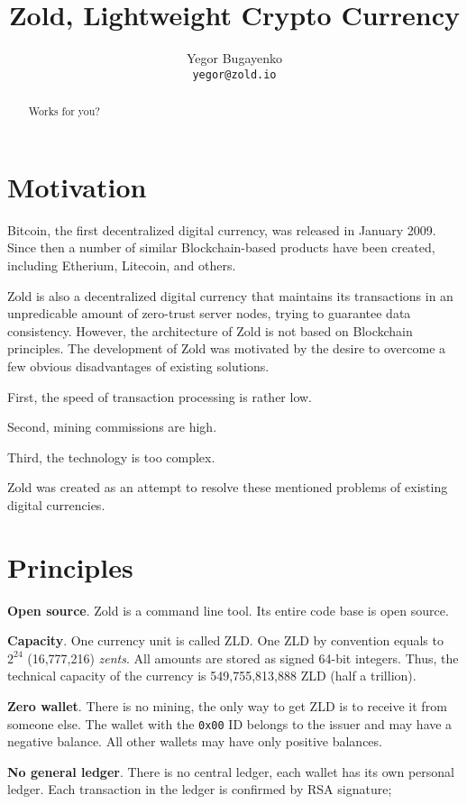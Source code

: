 \documentclass[11pt,oneside]{article}
\title{Zold, Lightweight Crypto Currency}
\author{Yegor Bugayenko\\\texttt{yegor@zold.io}}
\begin{document}
\raggedbottom
\maketitle
\begin{abstract}
Works for you?
\end{abstract}

\section{Motivation}

Bitcoin, the first decentralized digital currency, was released in
January 2009. Since then a number of similar Blockchain-based products have been
created, including Etherium, Litecoin, and others.

Zold is also a decentralized digital currency that maintains its transactions
in an unpredicable amount of zero-trust server nodes, trying to guarantee
data consistency. However, the architecture of Zold is not based on Blockchain
principles. The development of Zold was motivated by the desire to overcome
a few obvious disadvantages of existing solutions.

First, the speed of transaction processing is rather low.

Second, mining commissions are high.

Third, the technology is too complex.

Zold was created as an attempt to resolve these mentioned problems
of existing digital currencies.

\section{Principles}

\textbf{Open source}.
Zold is a command line tool. Its entire code base is open source.

\textbf{Capacity}.
One currency unit is called ZLD.
One ZLD by convention equals to $2^24$ (16,777,216) \emph{zents}.
All amounts are stored as signed 64-bit integers.
Thus, the technical capacity of the currency is 549,755,813,888 ZLD (half a trillion).

\textbf{Zero wallet}.
There is no mining, the only way to get ZLD is to receive it from someone else.
The wallet with the \texttt{0x00} ID belongs to the
issuer and may have a negative balance. All other wallets
may have only positive balances.

\textbf{No general ledger}.
There is no central ledger, each wallet has its own personal ledger.
Each transaction in the ledger is confirmed by RSA signature;
\end{document}
